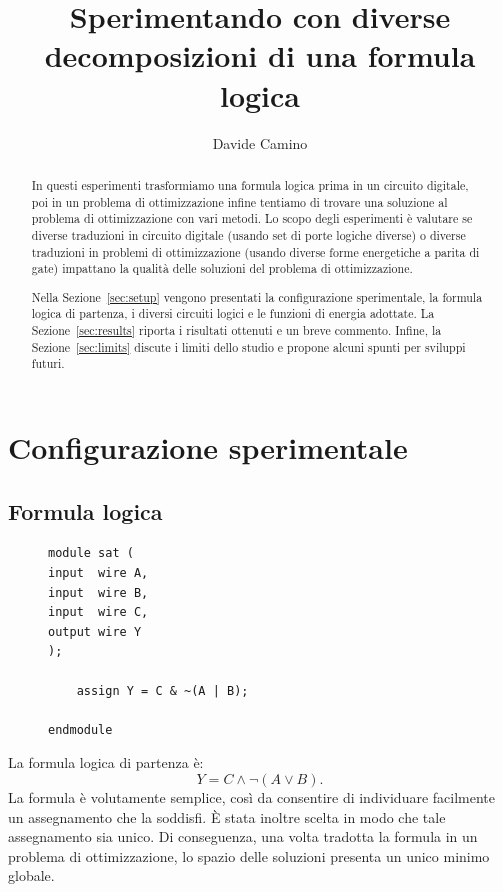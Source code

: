 \documentclass[]{article}
\title{Sperimentando con diverse \\decomposizioni di una formula logica}
\author{Davide Camino}
\begin{document}
\maketitle

\begin{abstract}
	In questi esperimenti trasformiamo una formula logica prima in un circuito digitale, poi in un problema di ottimizzazione infine tentiamo di trovare una soluzione al problema di ottimizzazione con vari metodi. Lo scopo degli esperimenti è valutare se diverse traduzioni in circuito digitale (usando set di porte logiche diverse) o diverse traduzioni in problemi di ottimizzazione (usando diverse forme energetiche a parita di gate) impattano la qualità delle soluzioni del problema di ottimizzazione.
	
	Nella Sezione~\ref{sec:setup} vengono presentati la configurazione sperimentale, la formula logica di partenza, i diversi circuiti logici e le funzioni di energia adottate. La Sezione~\ref{sec:results} riporta i risultati ottenuti e un breve commento. Infine, la Sezione~\ref{sec:limits} discute i limiti dello studio e propone alcuni spunti per sviluppi futuri.
\end{abstract}

\section{Configurazione sperimentale}\label{sec:setup}
\subsection{Formula logica}
\begin{figure}
	\centering
	\vspace{-.5cm}
	\begin{minipage}{.8\linewidth}
		\begin{verbatim}
module sat (
input  wire A,
input  wire B,
input  wire C,
output wire Y
);

	assign Y = C & ~(A | B);

endmodule
		\end{verbatim}
	\end{minipage}
	
\end{figure}
La formula logica di partenza è:
\begin{equation}
	Y = C \land \neg(A \lor B).
\end{equation}
La formula è volutamente semplice, così da consentire di individuare facilmente un assegnamento che la soddisfi. È stata inoltre scelta in modo che tale assegnamento sia unico. Di conseguenza, una volta tradotta la formula in un problema di ottimizzazione, lo spazio delle soluzioni presenta un unico minimo globale.
\end{document}
